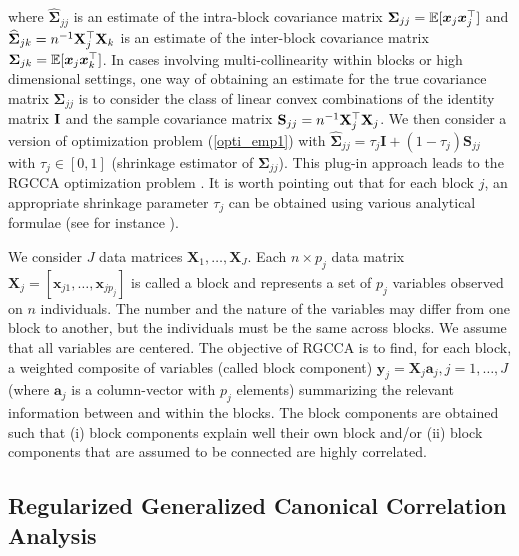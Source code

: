 \documentclass[
]{jss}
\begin{document}
where \(\widehat{\mathbf{\Sigma}}_{jj}\) is an estimate of the
intra-block covariance matrix
\(\mathbf{\Sigma}_{jj} = \mathbb{E}[\boldsymbol{x}_j\boldsymbol{x}_j^\top]\) and
\(\widehat{\mathbf{\Sigma}}_{jk} = n^{-1}\mathbf{X}_j^\top \mathbf{X}_k\) is an
estimate of the inter-block covariance matrix
\(\mathbf{\Sigma}_{jk}= \mathbb{E}[\boldsymbol{x}_j\boldsymbol{x}_k^\top]\). In cases
involving multi-collinearity within blocks or high dimensional settings,
one way of obtaining an estimate for the true covariance matrix
\(\mathbf{\Sigma}_{jj}\) is to consider the class of linear convex
combinations of the identity matrix \(\mathbf{I}\) and the sample covariance
matrix \(\mathbf{S}_{jj} = n^{-1}\mathbf{X}_j^\top \mathbf{X}_j\). We then
consider a version of optimization problem (\ref{opti_emp1}) with
\(\widehat{\mathbf{\Sigma}}_{jj} = \tau_j\mathbf{I} + (1-\tau_j)\mathbf{S}_{jj}\)
with \(\tau_j \in [0,1]\) (shrinkage estimator of
\(\mathbf{\Sigma}_{jj}\)). This plug-in approach leads to the RGCCA
optimization problem \citep{Tenenhaus2011}. It is worth pointing out
that for each block \(j\), an appropriate shrinkage parameter \(\tau_j\)
can be obtained using various analytical formulae (see for instance
\cite{Ledoit2004,Schafer2005,Chen2011}).

We consider \(J\) data matrices \(\mathbf{X}_1, \ldots, \mathbf{X}_J\).
Each \(n \times p_j\) data matrix
\(\mathbf{X}_j = [\ensuremath{\mathbf{x}}_{j1}, \ldots, \ensuremath{\mathbf{x}}_{jp_j}]\)
is called a block and represents a set of \(p_j\) variables observed on
\(n\) individuals. The number and the nature of the variables may differ
from one block to another, but the individuals must be the same across
blocks. We assume that all variables are centered. The objective of
RGCCA is to find, for each block, a weighted composite of variables
(called block component)
\(\mathbf{y}_j= \mathbf{X}_j \ensuremath{\mathbf{a}}_j,j=1, \ldots,J\)
(where \(\ensuremath{\mathbf{a}}_j\) is a column-vector with \(p_j\)
elements) summarizing the relevant information between and within the
blocks. The block components are obtained such that (i) block components
explain well their own block and/or (ii) block components that are
assumed to be connected are highly correlated.

\hypertarget{regularized-generalized-canonical-correlation-analysis}{%
\subsection{Regularized Generalized Canonical Correlation
Analysis}\label{regularized-generalized-canonical-correlation-analysis}}
\end{document}
